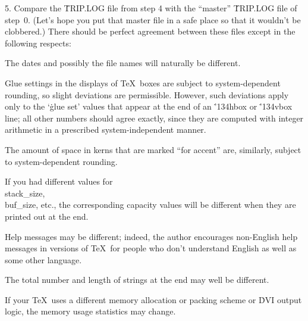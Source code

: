 \item{5.} Compare the \.{TRIP.LOG} file from step 4 with the ``master''
\.{TRIP.LOG} file of step~0. (Let's hope you put that master file in a
safe place so that it wouldn't be clobbered.) There should be perfect
agreement between these files except in the following respects:

 The dates and possibly the file names will
naturally be different.

 Glue settings in the displays of \TeX\ boxes are subject
to system-dependent rounding, so slight deviations are permissible. However,
such deviations apply only to the `\.{glue set}' values that appear at the
end of an \.{\char'134hbox} or \.{\char'134vbox} line;
all other numbers should agree exactly, since they are computed with
integer arithmetic in a prescribed system-independent manner.

 The amount of space in kerns that are marked ``for accent''
are, similarly, subject to system-dependent rounding.

 If you had different values for \\{stack\_size}, \\{buf\_size},
etc., the corresponding capacity values will be different when they
are printed out at the end.

 Help messages may be different; indeed, the author encourages
non-English help messages in versions of \TeX\ for people who don't
understand English as well as some other language.

 The total number and length of strings at the end may well
be different.

 If your \TeX\ uses a different memory allocation or
packing scheme or \.{DVI} output logic, the memory usage statistics may change.

